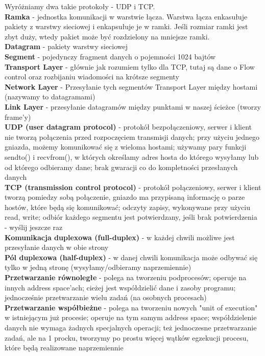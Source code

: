 \documentclass{article}
\begin{document}
Wyróżniamy dwa takie protokoły - UDP i TCP.
\\ \textbf{Ramka} - jednostka komunikacji w warstwie łącza.
Warstwa łącza enkasułuje pakiety z warstwy sieciowej i enkapsułuje je w ramki. Jeśli rozmiar ramki jest zbyt duży, wtedy pakiet może być rozdzielony na mniejsze ramki.
\\ \textbf{Datagram} - pakiety warstwy sieciowej
\\ \textbf{Segment} - pojedynczy fragment danych o pojemności 1024 bajtów
\\ \textbf{Transport Layer} - głównie jak rozumiem tylko dla TCP, tutaj są dane o Flow control oraz rozbijaniu wiadomości na krótsze segmenty
\\ \textbf{Network Layer} - Przesyłanie tych segmentów Transport Layer między hostami (nazywamy to datagramami)
\\ \textbf{Link Layer} - przesyłanie datagramów między punktami w naszej ścieżce (tworzy frame’y)
\\ \textbf{UDP (user datagram protocol)} - protokół bezpołączeniowy, serwer i klient nie tworzą połączenia przed rozpoczęciem transmisji danych; przy użyciu jednego gniazda, możemy komunikować się z wieloma hostami; używamy pary funkcji sendto() i recvfrom(), w których określamy adres hosta do
którego wysyłamy lub od którego odbieramy dane; brak gwaracji co do kompletności przesłanych danych
\\ \textbf{TCP (transmission control protocol)} - protokół połączeniowy, serwer i klient tworzą pomiedzy sobą połączenie, gniazdo ma przypisaną informację o parze hostów, które będą się komunikować; odczyty zapisy, wykonywane przy użyciu read, write; odbiór każdego segmentu jest potwierdzany, jeśli brak potwierdzenia - wyślij jeszcze raz
\\ \textbf{Komunikacja duplexowa (full-duplex)} - w każdej chwili możliwe jest przesyłanie danych w obie strony
\\ \textbf{Pól duplexowa (half-duplex)} - w danej chwili komunikacja może odbywać się tylko w jedną stronę (wysyłamy/odbieramy naprzemiennie)
\\ \textbf{Przetwarzanie równoległe} - polega na tworzeniu podprocesów; operuje na innych address space'ach; cieżej jest współdzielić dane i zasoby programu; jednocześnie przetwarzanie wielu zadań (na osobnych procesach)
\\ \textbf{Przetwarzanie współbieżne} - polega na tworzeniu nowych "unit of execution" w istniejącym już procesie; operuje na tym samym address space; współdzielenie danych nie wymaga żadnych specjalnych operacji; też jednoczesne przetwarzanie zadań, ale na 1 procku, tworzymy po prostu więcej wątków egzekucji procesu, które będą realizowane naprzemiennie
\end{document}
